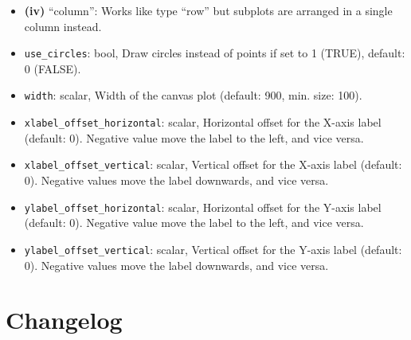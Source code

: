 \documentclass{article}
\begin{document}
\begin{itemize}
  \textbf{(iii)} ``row'': Plot the first series element in list
  \texttt{L} in a single row against all remaining list members.
\item
  \textbf{(iv)} ``column'': Works like type ``row'' but subplots are
  arranged in a single column instead.
\item
  \texttt{use\_circles}: bool, Draw circles instead of points if set to
  1 (TRUE), default: 0 (FALSE).
\item
  \texttt{width}: scalar, Width of the canvas plot (default: 900, min.
  size: 100).
\item
  \texttt{xlabel\_offset\_horizontal}: scalar, Horizontal offset for the
  X-axis label (default: 0). Negative value move the label to the left,
  and vice versa.
\item
  \texttt{xlabel\_offset\_vertical}: scalar, Vertical offset for the
  X-axis label (default: 0). Negative values move the label downwards,
  and vice versa.
\item
  \texttt{ylabel\_offset\_horizontal}: scalar, Horizontal offset for the
  Y-axis label (default: 0). Negative value move the label to the left,
  and vice versa.
\item
  \texttt{ylabel\_offset\_vertical}: scalar, Vertical offset for the
  Y-axis label (default: 0). Negative values move the label downwards,
  and vice versa.
\end{itemize}

\section{Changelog}\label{changelog}
\end{document}
